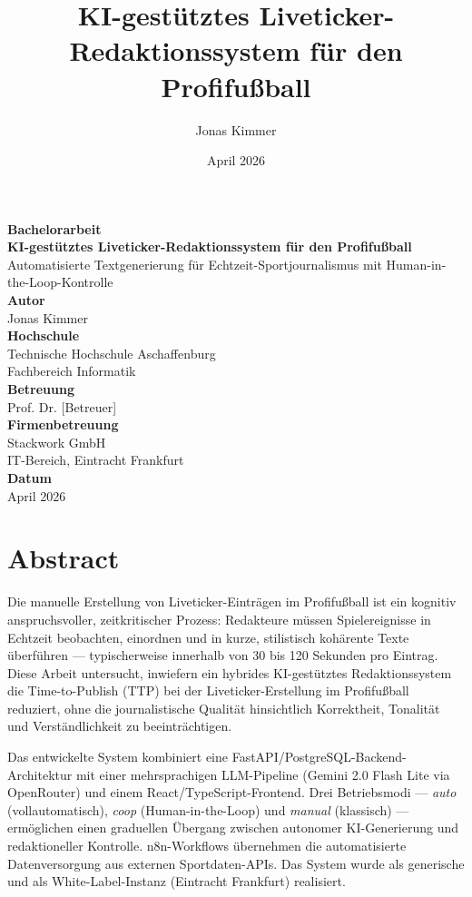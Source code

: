 \documentclass[12pt,a4paper,notitlepage,ngerman]{report}
\title{KI-gestütztes Liveticker-Redaktionssystem für den Profifußball}
\author{Jonas Kimmer}
\date{April 2026}
\begin{document}
\begin{titlepage}
\centering
\vspace*{2cm}
{\Large \textbf{Bachelorarbeit}}\\[2cm]
{\LARGE \textbf{KI-gestütztes Liveticker-Redaktionssystem für den Profifußball}}\\[0.5cm]
{\large Automatisierte Textgenerierung für Echtzeit-Sportjournalismus mit Human-in-the-Loop-Kontrolle}\\[3cm]
{\large \textbf{Autor}}\\
Jonas Kimmer\\[3cm]
{\large \textbf{Hochschule}}\\
Technische Hochschule Aschaffenburg\\[0.5cm]
Fachbereich Informatik\\[2cm]
{\large \textbf{Betreuung}}\\
Prof. Dr. [Betreuer]\\[3cm]
{\large \textbf{Firmenbetreuung}}\\
Stackwork GmbH\\
IT-Bereich, Eintracht Frankfurt\\[3cm]
{\large \textbf{Datum}}\\
April 2026
\end{titlepage}

\chapter*{Abstract}

Die manuelle Erstellung von Liveticker-Einträgen im Profifußball ist ein kognitiv anspruchsvoller, zeitkritischer Prozess: Redakteure müssen Spielereignisse in Echtzeit beobachten, einordnen und in kurze, stilistisch kohärente Texte überführen — typischerweise innerhalb von 30 bis 120 Sekunden pro Eintrag. Diese Arbeit untersucht, inwiefern ein hybrides KI-gestütztes Redaktionssystem die Time-to-Publish (TTP) bei der Liveticker-Erstellung im Profifußball reduziert, ohne die journalistische Qualität hinsichtlich Korrektheit, Tonalität und Verständlichkeit zu beeinträchtigen.

Das entwickelte System kombiniert eine FastAPI/PostgreSQL-Backend-Architektur mit einer mehrsprachigen LLM-Pipeline (Gemini 2.0 Flash Lite via OpenRouter) und einem React/TypeScript-Frontend. Drei Betriebsmodi — \textit{auto} (vollautomatisch), \textit{coop} (Human-in-the-Loop) und \textit{manual} (klassisch) — ermöglichen einen graduellen Übergang zwischen autonomer KI-Generierung und redaktioneller Kontrolle. n8n-Workflows übernehmen die automatisierte Datenversorgung aus externen Sportdaten-APIs. Das System wurde als generische und als White-Label-Instanz (Eintracht Frankfurt) realisiert.
\end{document}
